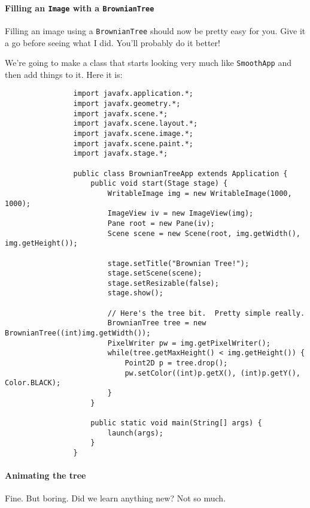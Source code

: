 \documentclass{article}
\begin{document}
        \paragraph{Filling an \texttt{Image} with a \texttt{BrownianTree}}
            Filling an image using a \texttt{BrownianTree} should now be pretty easy for you. Give it a go before seeing what I did. You'll
            probably do it better!
            
            We're going to make a class that starts looking very much like \texttt{SmoothApp} and then add things to it.  Here it is:
            
            \begin{verbatim}
                import javafx.application.*;
                import javafx.geometry.*;
                import javafx.scene.*;
                import javafx.scene.layout.*;
                import javafx.scene.image.*;
                import javafx.scene.paint.*;
                import javafx.stage.*;

                public class BrownianTreeApp extends Application {
                    public void start(Stage stage) {
                        WritableImage img = new WritableImage(1000, 1000);
                        ImageView iv = new ImageView(img);
                        Pane root = new Pane(iv);
                        Scene scene = new Scene(root, img.getWidth(), img.getHeight());

                        stage.setTitle("Brownian Tree!");
                        stage.setScene(scene);
                        stage.setResizable​(false);
                        stage.show();

                        // Here's the tree bit.  Pretty simple really.
                        BrownianTree tree = new BrownianTree((int)img.getWidth());
                        PixelWriter pw = img.getPixelWriter();
                        while(tree.getMaxHeight() < img.getHeight()) {
                            Point2D p = tree.drop();
                            pw.setColor((int)p.getX(), (int)p.getY(), Color.BLACK);
                        }
                    }

                    public static void main(String[] args) {
                        launch(args);
                    }
                }
            \end{verbatim}
        
        \newpage
        \paragraph{Animating the tree}
            Fine. But boring.  Did we learn anything new? Not so much.
            
\end{document}
